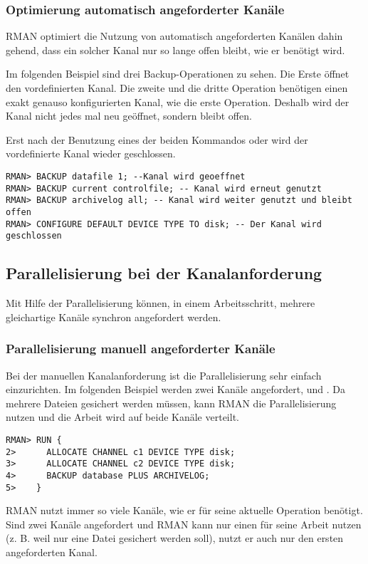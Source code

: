 
        \subsubsection{Optimierung automatisch angeforderter Kan\"ale}
          RMAN optimiert die Nutzung von automatisch angeforderten Kan\"alen dahin gehend, dass ein solcher Kanal nur so lange offen bleibt, wie er ben\"otigt wird.

          Im folgenden Beispiel sind drei Backup-Operationen zu sehen. Die Erste \"offnet den vordefinierten Kanal. Die zweite und die dritte Operation ben\"otigen einen exakt genauso konfigurierten Kanal, wie die erste Operation. Deshalb wird der Kanal nicht jedes mal neu ge\"offnet, sondern bleibt offen.

          \begin{merke}
            Erst nach der Benutzung eines der beiden Kommandos  oder  wird der vordefinierte Kanal wieder geschlossen.
          \end{merke}
          \begin{lstlisting}[caption={Optimierung der automatischen Kanalanforderung},label=admin1017,language=rman]
RMAN> BACKUP datafile 1; --Kanal wird geoeffnet
RMAN> BACKUP current controlfile; -- Kanal wird erneut genutzt
RMAN> BACKUP archivelog all; -- Kanal wird weiter genutzt und bleibt offen
RMAN> CONFIGURE DEFAULT DEVICE TYPE TO disk; -- Der Kanal wird geschlossen
          \end{lstlisting}
      \subsection{Parallelisierung bei der Kanalanforderung}
        Mit Hilfe der Parallelisierung k\"onnen, in einem Arbeitsschritt, mehrere gleichartige Kan\"ale synchron angefordert werden.
        \subsubsection{Parallelisierung manuell angeforderter Kan\"ale}
          Bei der manuellen Kanalanforderung ist die Parallelisierung sehr einfach einzurichten. Im folgenden Beispiel werden zwei Kan\"ale angefordert,  und . Da  mehrere Dateien gesichert werden m\"ussen, kann RMAN die Parallelisierung nutzen und die Arbeit wird auf beide Kan\"ale verteilt.
\clearpage
          \begin{lstlisting}[caption={Parallelisierung und die manuelle Kanalanforderung},label=admin1018,language=rman]
RMAN> RUN {
2>      ALLOCATE CHANNEL c1 DEVICE TYPE disk;
3>      ALLOCATE CHANNEL c2 DEVICE TYPE disk;
4>      BACKUP database PLUS ARCHIVELOG;
5>    }
          \end{lstlisting}
          \begin{merke}
            RMAN nutzt immer so viele Kan\"ale, wie er f\"ur seine aktuelle Operation ben\"otigt. Sind zwei Kan\"ale angefordert und RMAN kann nur einen f\"ur seine Arbeit nutzen (z. B. weil nur eine Datei gesichert werden soll), nutzt er auch nur den ersten angeforderten Kanal.
          \end{merke}
